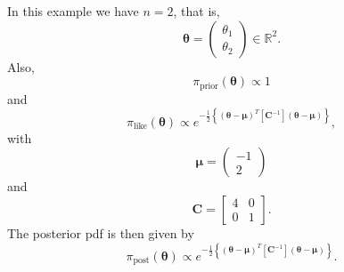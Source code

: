 In this example we have $n=2$, that is,
\begin{equation*}
\boldsymbol{\theta} = 
\left(
\begin{array}{c}
\theta_1 \\
\theta_2
\end{array}
\right)\in \mathbb{R}^2.
\end{equation*}
Also, 
\begin{equation*}
\pi_{\text{prior}}(\boldsymbol{\theta}) \varpropto 1
\end{equation*}
and
\begin{equation*}
\pi_{\text{like}}(\boldsymbol{\theta}) \varpropto e^{-\frac{1}{2}\left\{(\boldsymbol{\theta}-\boldsymbol{\mu})^T[\mathbf{C}^{-1}](\boldsymbol{\theta}-\boldsymbol{\mu})\right\}},
\end{equation*}
with
\begin{equation}\label{eq-example-mu}
\boldsymbol{\mu} = 
\left(
\begin{array}{c}
-1 \\
2
\end{array}
\right)
\end{equation}
and
\begin{equation}\label{eq-example-cov-mat}
\mathbf{C} = 
\left[
\begin{array}{cc}
4 & 0 \\
0 & 1
\end{array}
\right].
\end{equation}
The posterior pdf is then given by
\begin{equation}\label{eq-example-post}
\pi_{\text{post}}(\boldsymbol{\theta}) \varpropto e^{-\frac{1}{2}\left\{(\boldsymbol{\theta}-\boldsymbol{\mu})^T[\mathbf{C}^{-1}](\boldsymbol{\theta}-\boldsymbol{\mu})\right\}}.
\end{equation}

